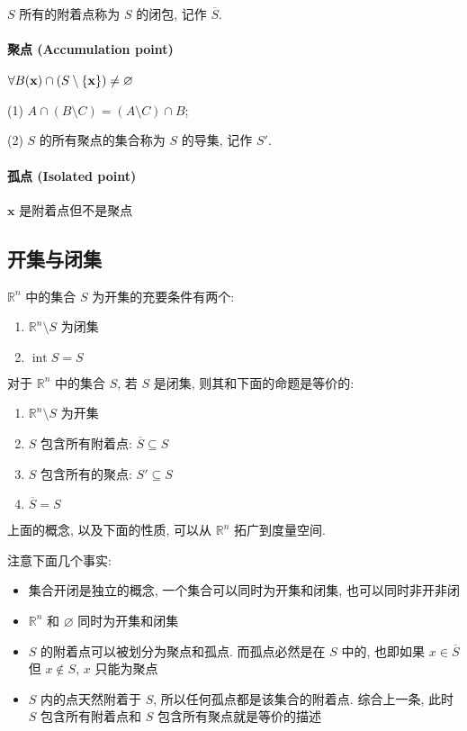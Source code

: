 \documentclass[UTF8]{ctexart}
\theoremstyle{mystyle}
\newcommand{\ve}[1]{\boldsymbol{\mathbf{#1}}}
\newcommand{\R}{\mathbb R}
\DeclarePairedDelimiter\set{\lbrace}{\rbrace}
\DeclareMathOperator{\interior}{int}
\begin{document}
$ S $ 所有的附着点称为 $ S $ 的闭包, 记作 $ \overline S $.

\paragraph{聚点 (Accumulation point)}
$ \forall B(\ve x) \cap (S \setminus \set{\ve x}) \neq \varnothing $

(1) $ A \cap (B \setminus C) = (A \setminus C) \cap B $; 

(2) $ S $ 的所有聚点的集合称为 $ S $ 的导集, 记作 $ S' $.

\paragraph{孤点 (Isolated point)}
$ \ve x $ 是附着点但不是聚点 



\subsection{开集与闭集}
$ \R^n $ 中的集合 $ S $ 为开集的充要条件有两个:
\begin{enumerate}
    \item $ \R^n \setminus S $ 为闭集
    \item $ \interior S = S $
\end{enumerate}

对于 $ \R^n $ 中的集合 $ S $, 若 $ S $ 是闭集, 则其和下面的命题是等价的:
\begin{enumerate}
    \item $ \R^n \setminus S $ 为开集
    \item $ S $ 包含所有附着点: $ \overline S \subseteq S $
    \item $ S $ 包含所有的聚点: $ S' \subseteq S $
    \item $ \overline S = S $
\end{enumerate}

上面的概念, 以及下面的性质, 可以从 $ \R^n $ 拓广到度量空间.

注意下面几个事实:
\begin{itemize}
    \item 集合开闭是独立的概念, 一个集合可以同时为开集和闭集, 也可以同时非开非闭
    \item $ \R^n $ 和 $ \varnothing $ 同时为开集和闭集
    \item $ S $ 的附着点可以被划分为聚点和孤点. 而孤点必然是在 $ S $ 中的, 也即如果 $ x \in \overline S $ 但 $ x \notin S $, $ x $ 只能为聚点
    \item $ S $ 内的点天然附着于 $ S $, 所以任何孤点都是该集合的附着点. 综合上一条, 此时 $ S $ 包含所有附着点和 $ S $ 包含所有聚点就是等价的描述
\end{itemize}
\end{document}
